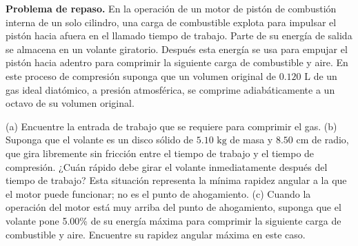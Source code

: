 \item \textbf{Problema de repaso.} En la operación de un motor de pistón de combustión interna de un solo cilindro, una carga de combustible explota para impulsar el pistón hacia afuera en el llamado tiempo de trabajo. Parte de su energía de salida se almacena en un volante giratorio. Después esta energía se usa para empujar el pistón hacia adentro para comprimir la siguiente carga de combustible y aire. En este proceso de compresión suponga que un volumen original de $0.120\text{ L}$ de un gas ideal diatómico, a presión atmosférica, se comprime adiabáticamente a un octavo de su volumen original. 

(a) Encuentre la entrada de trabajo que se requiere para comprimir el gas. 
(b) Suponga que el volante es un disco sólido de $5.10\text{ kg}$ de masa y $8.50\text{ cm}$ de radio, que gira libremente sin fricción entre el tiempo de trabajo y el tiempo de compresión. ¿Cuán rápido debe girar el volante inmediatamente después del tiempo de trabajo? Esta situación representa la mínima rapidez angular a la que el motor puede funcionar; no es el punto de ahogamiento. 
(c) Cuando la operación del motor está muy arriba del punto de ahogamiento, suponga que el volante pone 5.00\% de su energía máxima para comprimir la siguiente carga de combustible y aire. Encuentre su rapidez angular máxima en este caso.
